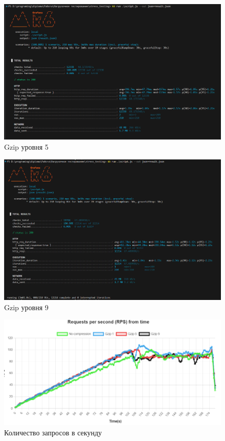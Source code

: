 \documentclass[12pt]{article}
\begin{document}
\begin{figure}[H]
    \centering
    \includegraphics[width=1\textwidth]{../images/second_part/gzip5_screenshot.png}
    \caption{Gzip уровня 5}
\end{figure}

\begin{figure}[H]
    \centering
    \includegraphics[width=1\textwidth]{../images/second_part/gzip9_screenshot.png}
    \caption{Gzip уровня 9}
\end{figure}

\begin{figure}[H]
    \centering
    \includegraphics[width=1\textwidth]{../images/second_part/RPS.png}
    \caption{Количество запросов в секунду}
\end{figure}
\end{document}
